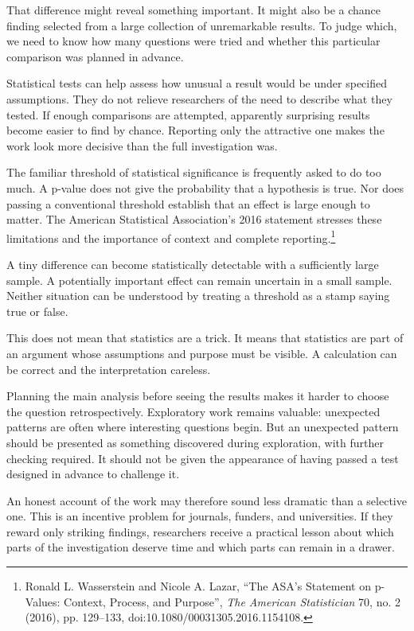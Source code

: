 \documentclass[12pt,a4paper]{book}
\begin{document}
That difference might reveal something important. It might also be a chance finding selected from a large collection of unremarkable results. To judge which, we need to know how many questions were tried and whether this particular comparison was planned in advance.

Statistical tests can help assess how unusual a result would be under specified assumptions. They do not relieve researchers of the need to describe what they tested. If enough comparisons are attempted, apparently surprising results become easier to find by chance. Reporting only the attractive one makes the work look more decisive than the full investigation was.

The familiar threshold of statistical significance is frequently asked to do too much. A p-value does not give the probability that a hypothesis is true. Nor does passing a conventional threshold establish that an effect is large enough to matter. The American Statistical Association's 2016 statement stresses these limitations and the importance of context and complete reporting.\footnote{Ronald L. Wasserstein and Nicole A. Lazar, ``The ASA's Statement on p-Values: Context, Process, and Purpose'', \emph{The American Statistician} 70, no. 2 (2016), pp. 129--133, doi:10.1080/00031305.2016.1154108.}

A tiny difference can become statistically detectable with a sufficiently large sample. A potentially important effect can remain uncertain in a small sample. Neither situation can be understood by treating a threshold as a stamp saying true or false.

This does not mean that statistics are a trick. It means that statistics are part of an argument whose assumptions and purpose must be visible. A calculation can be correct and the interpretation careless.

Planning the main analysis before seeing the results makes it harder to choose the question retrospectively. Exploratory work remains valuable: unexpected patterns are often where interesting questions begin. But an unexpected pattern should be presented as something discovered during exploration, with further checking required. It should not be given the appearance of having passed a test designed in advance to challenge it.

An honest account of the work may therefore sound less dramatic than a selective one. This is an incentive problem for journals, funders, and universities. If they reward only striking findings, researchers receive a practical lesson about which parts of the investigation deserve time and which parts can remain in a drawer.
\end{document}
